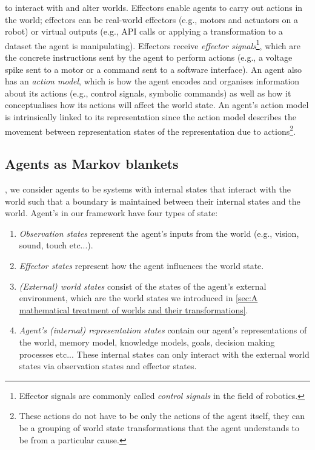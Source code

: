  to interact with and alter worlds.
Effectors enable agents to carry out actions in the world; effectors can be real-world effectors (e.g., motors and actuators on a robot) or virtual outputs (e.g., API calls or applying a transformation to a dataset the agent is manipulating).
Effectors receive \emph{effector signals}\footnote{
Effector signals are commonly called \emph{control signals} in the field of robotics.
}, which are the concrete instructions sent by the agent to perform actions (e.g., a voltage spike sent to a motor or a command sent to a software interface).
An agent also has an \emph{action model}, which is how the agent encodes and organises information about its actions (e.g., control signals, symbolic commands) as well as how it conceptualises how its actions will affect the world state.
An agent's action model is intrinsically linked to its representation since the action model describes the movement between representation states of the representation due to actions\footnote{
These actions do not have to be only the actions of the agent itself, they can be a grouping of world state transformations that the agent understands to be from a particular cause.
}.

\subsection{Agents as Markov blankets}

, we consider agents to be systems with internal states that interact with the world such that a boundary is maintained between their internal states and the world.
Agent's in our framework have four types of state:
\begin{enumerate}
	\item \emph{Observation states} represent the agent's inputs from the world (e.g., vision, sound, touch etc...).
	\item \emph{Effector states} represent how the agent influences the world state.
	\item \emph{(External) world states} consist of the states of the agent's external environment, which are the world states we introduced in \cref{sec:A mathematical treatment of worlds and their transformations}.
	\item \emph{Agent's (internal) representation states} contain our agent's representations of the world, memory model, knowledge models, goals, decision making processes etc...
	      These internal states can only interact with the external world states via observation states and effector states.
\end{enumerate}

